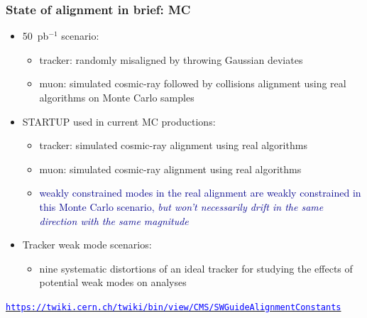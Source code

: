 \documentclass[compress]{beamer}
\begin{document}
\begin{frame}
\frametitle{State of alignment in brief: MC}
\begin{itemize}
\item 50~pb$^{-1}$ scenario:
\begin{itemize}
\item tracker: randomly misaligned by throwing Gaussian deviates
\item muon: simulated cosmic-ray followed by collisions alignment using real algorithms on Monte Carlo samples
\end{itemize}

\item STARTUP used in current MC productions:
\begin{itemize}
\item tracker: simulated cosmic-ray alignment using real algorithms
\item muon: simulated cosmic-ray alignment using real algorithms
\item \textcolor{darkblue}{weakly constrained modes in the real alignment are weakly
  constrained in this Monte Carlo scenario, {\it but won't necessarily drift in the same direction with the same magnitude}}
\end{itemize}

\item Tracker weak mode scenarios:
\begin{itemize}
\item nine systematic distortions of an ideal tracker for studying the
  effects of potential weak modes on analyses
\end{itemize}
\end{itemize}

\href{https://twiki.cern.ch/twiki/bin/view/CMS/SWGuideAlignmentConstants}{\tt \scriptsize \textcolor{blue}{https://twiki.cern.ch/twiki/bin/view/CMS/SWGuideAlignmentConstants}}
\end{frame}
\end{document}

